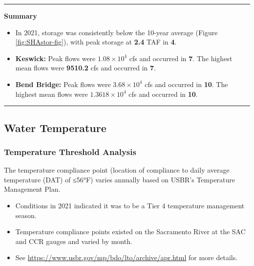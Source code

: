 \documentclass[
]{book}
\providecommand{\tightlist}{%
  \setlength{\itemsep}{0pt}\setlength{\parskip}{0pt}}
\theoremstyle{definition}
\theoremstyle{definition}
\theoremstyle{definition}
\theoremstyle{definition}
\theoremstyle{remark}
\begin{document}
\begin{center}\rule{0.5\linewidth}{0.5pt}\end{center}

\textbf{Summary}

\begin{itemize}
\tightlist
\item
  In 2021, storage was consistently below the 10-year average (Figure \ref{fig:SHAstor-fig}), with peak storage at \textbf{2.4} TAF in \textbf{4}.
\item
  \textbf{Keswick:} Peak flows were \textbf{\ensuremath{1.08\times 10^{4}}} cfs and occurred in \textbf{7}. The highest mean flows were \textbf{9510.2} cfs and occurred in \textbf{7}.
\item
  \textbf{Bend Bridge:} Peak flows were \textbf{\ensuremath{3.68\times 10^{4}}} cfs and occurred in \textbf{10}. The highest mean flows were \textbf{\ensuremath{1.3618\times 10^{4}}} cfs and occurred in \textbf{10}.
\end{itemize}

\begin{center}\rule{0.5\linewidth}{0.5pt}\end{center}

\hypertarget{water-temperature}{%
\subsection{Water Temperature}\label{water-temperature}}

\hypertarget{temp-thresholds}{%
\subsubsection{Temperature Threshold Analysis}\label{temp-thresholds}}

The temperature compliance point (location of compliance to daily average temperature (DAT) of ≤56°F) varies annually based on USBR's Temperature Management Plan.

\begin{itemize}
\tightlist
\item
  Conditions in 2021 indicated it was to be a Tier 4 temperature management season.
\item
  Temperature compliance points existed on the Sacramento River at the SAC and CCR gauges and varied by month.
\item
  See \url{https://www.usbr.gov/mp/bdo/lto/archive/apr.html} for more details.
\end{itemize}
\end{document}
